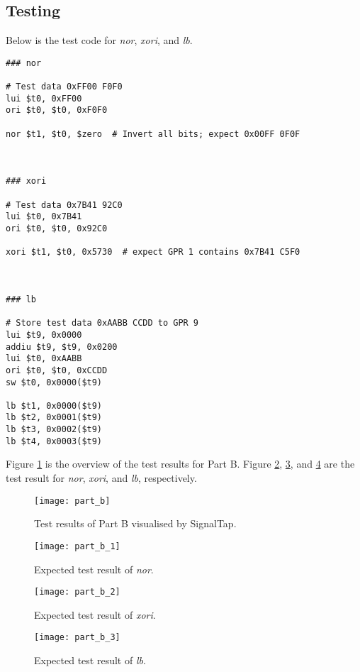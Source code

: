 \subsection{Testing}

Below is the test code for \textit{nor}, \textit{xori}, and \textit{lb}.

\begin{verbatim}
### nor

# Test data 0xFF00 F0F0
lui $t0, 0xFF00
ori $t0, $t0, 0xF0F0

nor $t1, $t0, $zero  # Invert all bits; expect 0x00FF 0F0F



### xori

# Test data 0x7B41 92C0
lui $t0, 0x7B41
ori $t0, $t0, 0x92C0

xori $t1, $t0, 0x5730  # expect GPR 1 contains 0x7B41 C5F0



### lb

# Store test data 0xAABB CCDD to GPR 9
lui $t9, 0x0000
addiu $t9, $t9, 0x0200
lui $t0, 0xAABB
ori $t0, $t0, 0xCCDD
sw $t0, 0x0000($t9)

lb $t1, 0x0000($t9)
lb $t2, 0x0001($t9)
lb $t3, 0x0002($t9)
lb $t4, 0x0003($t9)
\end{verbatim}

Figure \ref{fig:part_b} is the overview of the test results for Part B. Figure \ref{fig:nor}, \ref{fig:xori}, and \ref{fig:lb} are the test result for \textit{nor}, \textit{xori}, and \textit{lb}, respectively.

\begin{figure}[htbp]
   \centering
   \texttt{[image: part\_b]}
   \caption{Test results of Part B visualised by SignalTap.}
   \label{fig:part_b}
\end{figure}

\begin{figure}[htbp]
   \centering
   \texttt{[image: part\_b\_1]}
   \caption{Expected test result of \textit{nor}.}
   \label{fig:nor}
\end{figure}

\begin{figure}[htbp]
   \centering
   \texttt{[image: part\_b\_2]}
   \caption{Expected test result of \textit{xori}.}
   \label{fig:xori}
\end{figure}

\begin{figure}[htbp]
   \centering
   \texttt{[image: part\_b\_3]}
   \caption{Expected test result of \textit{lb}.}
   \label{fig:lb}
\end{figure}

